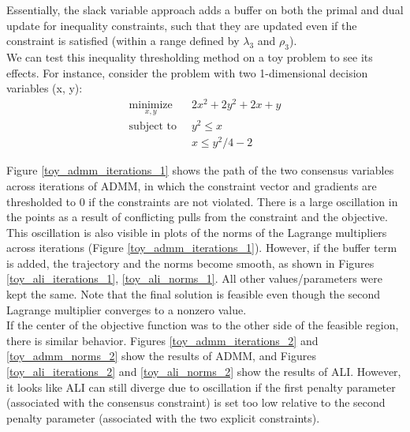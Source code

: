 \documentclass{article}
\begin{document}
Essentially, the slack variable approach adds a buffer on both the primal and dual update for inequality constraints, such that they are updated even if the constraint is satisfied (within a range defined by $\lambda_3$ and $\rho_3$). \\

We can test this inequality thresholding method on a toy problem to see its effects. For instance, consider the problem with two 1-dimensional decision variables (x, y):
\begin{align*}
\underset{x, y}{\text{minimize}} \; \; &2 x^2 + 2 y^2 + 2x + y \\
\text{subject to} \; \; &y^2 \leq x \\
&x \leq y^2/4 - 2
\end{align*}

Figure \ref{toy_admm_iterations_1} shows the path of the two consensus variables across iterations of ADMM, in which the constraint vector and gradients are thresholded to 0 if the constraints are not violated. There is a large oscillation in the points as a result of conflicting pulls from the constraint and the objective. This oscillation is also visible in plots of the norms of the Lagrange multipliers across iterations (Figure \ref{toy_admm_iterations_1}). However, if the buffer term is added, the trajectory and the norms become smooth, as shown in Figures \ref{toy_ali_iterations_1}, \ref{toy_ali_norms_1}. All other values/parameters were kept the same. Note that the final solution is feasible even though the second Lagrange multiplier converges to a nonzero value. \\

If the center of the objective function was to the other side of the feasible region, there is similar behavior. Figures \ref{toy_admm_iterations_2} and \ref{toy_admm_norms_2} show the results of ADMM, and Figures  \ref{toy_ali_iterations_2} and \ref{toy_ali_norms_2} show the results of ALI. However, it looks like ALI can still diverge due to oscillation if the first penalty parameter (associated with the consensus constraint) is set too low relative to the second penalty parameter (associated with the two explicit constraints).
\end{document}
